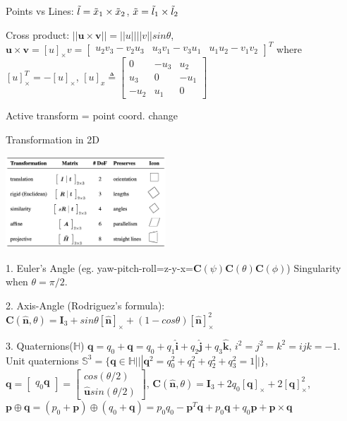 \documentclass[10pt,landscape]{article}
\begin{document}
\begin{multicols}{3}
Points vs Lines: $\Tilde{l} = \Tilde{x}_1 \times \Tilde{x}_2$, $\Tilde{x} = \Tilde{l}_1 \times \Tilde{l}_2$

Cross product: $||\mathbf{u} \times \mathbf{v}|| = ||u||||v||sin\theta$, $\mathbf{u} \times \mathbf{v} = [u]_\times v = \begin{bmatrix} u_2v_3-v_2u_3 & u_3v_1-v_3u_1 & u_1u_2-v_1v_2\end{bmatrix}^T$ where $[u]_\times^T = -[u]_\times$, $[u]_x \triangleq \begin{bmatrix} 0 & -u_3 & u_2 \\ u_3 & 0 & -u_1 \\ -u_2 & u_1 & 0\end{bmatrix}$

Active transform = point coord. change

Transformation in 2D

\includegraphics[width=6cm]{images/trans_2d}

1. Euler’s Angle (eg. yaw-pitch-roll=z-y-x=$\mathbf{C}(\psi)\mathbf{C}(\theta)\mathbf{C}(\phi)$) Singularity when $\theta = \pi/2$.

2. Axis-Angle (Rodriguez's formula): $\mathbf{C}(\hat{\mathbf{n}}, \theta) = \mathbf{I}_3 + sin\theta [\hat{\mathbf{n}}]_\times + (1-cos\theta)[\hat{\mathbf{n}}]^2_\times$

3. Quaternions($\mathbb{H}$)
$\bm{q} = q_0 + \mathbf{q} = q_0 + q_1\hat{\mathbf{i}} + q_2\hat{\mathbf{j}} + q_3\hat{\mathbf{k}}$, $i^2 =j^2=k^2=ijk=-1$. Unit quaternions $\mathbb{S}^3 = \{\bm{q}\in \mathbb{H} | ||\bm{q}^2 = q_0^2 + q_1^2 + q_2^2 + q_3^2=1||\}$, $\bm{q} = \begin{bmatrix} q_0 \mathbf{q}\end{bmatrix} = \begin{bmatrix} cos(\theta/2) \\ \hat{\mathbf{u}}sin(\theta/2)\end{bmatrix}$, $\mathbf{C}(\hat{\mathbf{n}}, \theta) = \mathbf{I}_3 + 2q_0[\mathbf{q}]_\times + 2[\mathbf{q}]_\times^2$, $\bm{p}\oplus\bm{q} = (p_0+\mathbf{p}) \oplus (q_0+\mathbf{q}) = p_0q_0-\mathbf{p}^T\mathbf{q}+p_0\mathbf{q}+q_0\mathbf{p}+\mathbf{p}\times\mathbf{q}$




\end{multicols}
\end{document}

